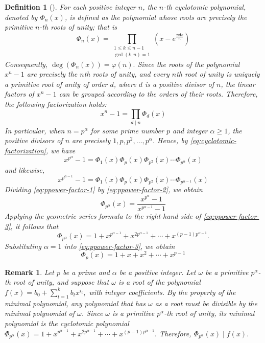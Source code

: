 \documentclass[12pt]{article}
\newtheorem{definition}[formula]{Definition}
\newtheorem{rem}[formula]{Remark}
\begin{document}
  \begin{definition}[{\cite[Chapter 13]{Dummit}}]\label{poly}
	For each positive integer $n$, the $n$-th cyclotomic polynomial, denoted by $\Phi_n(x)$, is defined as the polynomial whose roots are precisely the primitive $n$-th roots of unity; that is
	\[
	\Phi_n(x)=
	\prod_{\substack{1\le k\le n-1\\ \gcd(k,n)=1}}
	\left(x-e^{\frac{2\pi \mathbf{i} k}{n}}\right)
	\]
\noindent Consequently,
	$
	\deg(\Phi_n(x))=\varphi(n).
	$
	\noindent Since the roots of the polynomial $x^n-1$ are precisely the $n$th roots of unity, and every $n$th root of unity is uniquely a primitive root of unity of order $d$, where $d$ is a positive divisor of $n$, the linear factors of $x^n-1$ can be grouped according to the orders of their roots. Therefore, the following factorization holds:
	\begin{equation}
		x^n-1=\prod_{d\mid n}\Phi_d(x)
		\label{eq:cyclotomic-factorization}
	\end{equation}
In particular, when $n=p^\alpha$ for some prime number $p$ and integer $\alpha\ge 1$, the positive divisors of $n$ are precisely $1,p,p^2,\dots,p^\alpha$. Hence, by \eqref{eq:cyclotomic-factorization}, we have
\begin{equation}
	x^{p^\alpha}-1=\Phi_1(x)\Phi_p(x)\Phi_{p^2}(x)\cdots\Phi_{p^\alpha}(x)
	\label{eq:ppower-factor-1}
\end{equation}
and likewise,
\begin{equation}
	x^{p^{\alpha-1}}-1=\Phi_1(x)\Phi_p(x)\Phi_{p^2}(x)\cdots\Phi_{p^{\alpha-1}}(x)
	\label{eq:ppower-factor-2}
\end{equation}
Dividing \eqref{eq:ppower-factor-1} by \eqref{eq:ppower-factor-2}, we obtain
\begin{equation}
\Phi_{p^\alpha}(x)=\frac{x^{p^\alpha}-1}{x^{p^{\alpha-1}}-1}
\label{eq:ppower-factor-3}
\end{equation}
Applying the geometric series formula to the right-hand side of \eqref{eq:ppower-factor-3}, it follows that
\[
\Phi_{p^\alpha}(x)=1+x^{p^{\alpha-1}}+x^{2p^{\alpha-1}}+\cdots+x^{(p-1)p^{\alpha-1}}.
\]
Substituting $\alpha=1$ into \eqref{eq:ppower-factor-3}, we obtain
\[
\Phi_p(x)=1+x+x^2+\cdots+x^{p-1}
\]
	\end{definition}
\begin{rem}\label{rem:cyclo}
Let $p$ be a prime and $\alpha$ be a positive integer. Let $\omega$ be a primitive $p^\alpha$-th root of unity, and suppose that $\omega$ is a root of the polynomial
$
f(x)=b_0+\sum_{t=1}^{k}b_tx^{i_t},
$
with integer coefficients. By the property of the minimal polynomial, any polynomial that has $\omega$ as a root must be divisible by the minimal polynomial of $\omega$. Since $\omega$ is a primitive $p^\alpha$-th root of unity, its minimal polynomial is the cyclotomic polynomial
$
\Phi_{p^\alpha}(x)=1+x^{p^{\alpha-1}}+x^{2p^{\alpha-1}}+\cdots+x^{(p-1)p^{\alpha-1}}.
$
Therefore,
$
\Phi_{p^\alpha}(x)\mid f(x).
$
\end{rem}
  	
\end{document}
